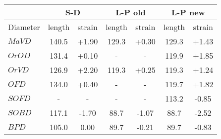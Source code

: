\documentclass[a4paper, oneside, 11pt]{report}
\newcommand{\mi}{\mathit}
\begin{document}
\begin{algorithm}[th]
%	
%	
\end{algorithm}


\begin{table}[h]
\begin{center}
\begin{tabular}{|l|c|c||c|c||c|c|}\hline
& \multicolumn{2}{c||}{S-D} & \multicolumn{2}{c||}{L-P old} & \multicolumn{2}{c|}{L-P new} \\ \hline
Diameter & length & strain & length & strain & length & strain \\ \hline
$\mi{MaVD}$ & 140.5 & +1.90 & 129.3 & +0.30 & 129.3 & +1.43 \\
$\mi{OrOD}$ & 131.4 & +0.10 &   -   &  -    & 119.9 & +1.85 \\
$\mi{OrVD}$ & 126.9 & +2.20 & 119.3 & +0.25 & 119.3 & +1.24 \\
$\mi{OFD}$  & 134.0 & +0.40 &  -    &   -   & 119.7 & +1.82 \\ 
$\mi{SOFD}$ &  -    &   -   &  -    &   -   & 113.2 & -0.85 \\
$\mi{SOBD}$ & 117.1 & -1.70 &  88.7 & -1.07 &  88.7 & -2.52 \\
$\mi{BPD}$  & 105.0 &  0.00 &  89.7 & -0.21 &  89.7 & -0.83 \\ \hline
\end{tabular}
\end{center}
\end{table}
\end{document}
